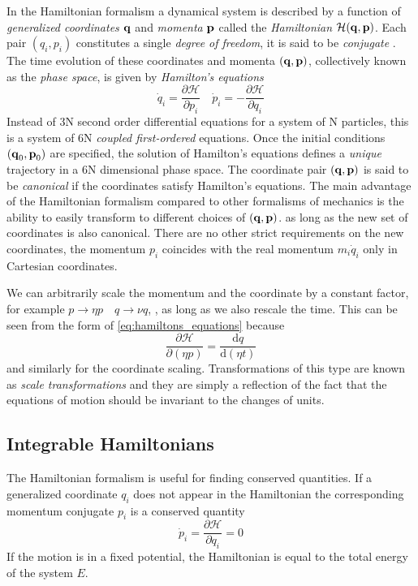 \documentclass[twoside,openright,titlepage,numbers=noenddot,headinclude,%
                footinclude=true,cleardoublepage=empty,abstractoff, 
                BCOR=5mm,paper=a4,fontsize=11pt,%
                american,%
                ]{scrreprt}%
\begin{document}
In the Hamiltonian formalism a dynamical system is described by 
a function of \emph{generalized coordinates} $\boldsymbol{\mathbf{q}}$ and \emph{momenta} 
$\boldsymbol{\mathbf{p}}$ called the \emph{Hamiltonian} $\mathcal{H}(\boldsymbol{\mathbf{q}},
\boldsymbol{\mathbf{p}})$. Each pair $(q_i,p_i)$ constitutes a single 
\emph{degree of freedom}, it is said to be \emph{conjugate} . 
The time evolution of these coordinates and 
momenta
$(\boldsymbol{\mathbf{q}},\boldsymbol{\mathbf{p}})$, collectively known as the \emph{phase space},
is given by \emph{Hamilton's equations} 
\begin{equation}
    \dot{q}_i= \frac{\partial \mathcal{H}}{\partial p_i}\quad
    \dot{p}_i= -\frac{\partial \mathcal{H}}{\partial q_i} 
    \label{eq:hamiltons_equations}
\end{equation}
Instead of 3N second order differential equations for a system of N particles,
this is a system of
6N \emph{coupled first-ordered} equations. Once the initial conditions
$(\boldsymbol{\mathbf{q}}_0,\boldsymbol{\mathbf{p}}_0)$ are specified, the solution of Hamilton's 
equations defines a \emph{unique} trajectory in a 
6N dimensional phase space. The coordinate pair $(\boldsymbol{\mathbf{q}},\boldsymbol{\mathbf{p}})$
is said to be \emph{canonical} if the coordinates satisfy 
Hamilton's equations. The main advantage of the Hamiltonian
formalism compared to other formalisms of mechanics is the ability
to easily transform to different choices of $(\boldsymbol{\mathbf{q}},\boldsymbol{\mathbf{p}})$.
as long as the new set of coordinates is also canonical. There are no
other strict requirements on the new coordinates, the momentum 
$p_i$ coincides with the real momentum $m_i \dot{q}_i$ only in
Cartesian coordinates.

We can arbitrarily scale the momentum and the coordinate by a 
constant factor, for example $p\rightarrow\eta p\quad q\rightarrow\nu q$, 
, as long as we also
rescale the time. This can be seen from the form of 
\cref{eq:hamiltons_equations} because
\begin{equation}
    \frac{\partial \mathcal{H}}{\partial (\eta p)}= 
    \frac{\mathrm{d}q}{\mathrm{d}(\eta t)}  
    \label{eq:rescaling_hamiltonian}
\end{equation}
and similarly for the coordinate scaling. Transformations of this
type are known as \emph{scale transformations} and they are simply 
a reflection of the fact that the equations of motion should be invariant
to the changes of units.
\subsection{Integrable Hamiltonians}
The Hamiltonian formalism is useful for finding conserved quantities.
If a generalized coordinate $q_i$ does not appear in the Hamiltonian
the corresponding momentum conjugate $p_i$ is a conserved quantity
\begin{equation}
    \dot{p}_i= \frac{\partial \mathcal{H}}{\partial q_i} =0
\end{equation}
If the motion is in a fixed potential, the Hamiltonian is equal
to the total energy of the system $E$.
\end{document}
